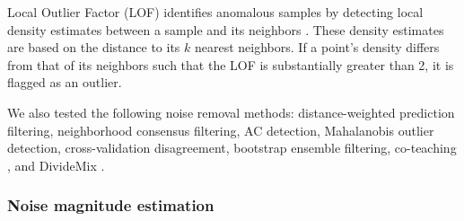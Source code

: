 Local Outlier Factor (LOF) identifies anomalous samples by detecting local density estimates between a sample and its neighbors \citep{Breunig2000}. These density estimates are based on the distance to its $k$ nearest neighbors. If a point's density differs from that of its neighbors such that the LOF is substantially greater than 2, it is flagged as an outlier.

We also tested the following noise removal methods:  distance-weighted prediction filtering, neighborhood consensus filtering, AC detection, Mahalanobis outlier detection, cross-validation disagreement, bootstrap ensemble filtering, co-teaching \citep{Han2018}, and DivideMix \citep{li2020}.

\subsubsection{Noise magnitude estimation}

